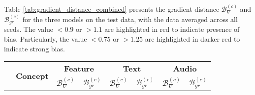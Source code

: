 Table \ref{tab:gradient_distance_combined} presents the gradient distance $\mathcal{B}^{(c)}_{\nabla}$ and $\mathcal{B}^{(c)}_{gr}$ for the three models on the test data, with the data averaged across all seeds. The value $< 0.9$ or $> 1.1$ are highlighted in red to indicate presence of bias. Particularly, the value $< 0.75$ or $> 1.25$ are highlighted in darker red to indicate strong bias.
\begin{table}[H]
    \begin{tabular}{|c|c|c|c|c|c|c|c|}
        \hline
        \multirow{2}{*}{} & \multirow{2}{*}{\textbf{Concept}} & \multicolumn{2}{c|}{\textbf{Feature}}                      & \multicolumn{2}{c|}{\textbf{Text}}    & \multicolumn{2}{c|}{\textbf{Audio}}                                                                                                                                                                     \\ \cline{3-8}
                          &                                   & \multicolumn{1}{c|}{\textbf{$\mathcal{B}^{(c)}_{\nabla}$}} & \textbf{$\mathcal{B}^{(c)}_{gr}$}     & \multicolumn{1}{c|}{\textbf{$\mathcal{B}^{(c)}_{\nabla}$}} & \textbf{$\mathcal{B}^{(c)}_{gr}$}     & \multicolumn{1}{c|}{\textbf{$\mathcal{B}^{(c)}_{\nabla}$}} & \textbf{$\mathcal{B}^{(c)}_{gr}$}     \\ \hline


\end{tabular}
\end{table}

